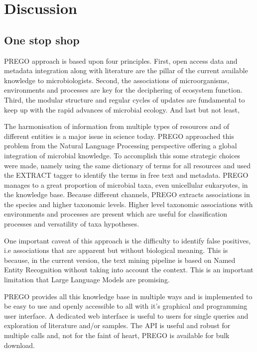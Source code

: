 \section{Discussion}
\label{sec:prego-discussion}

   \subsection{One stop shop}
   \label{subsec:prego-contents-disc}

PREGO approach is based upon four principles. First, open access data and
metadata integration along with literature are the pillar of the current
available knowledge to microbiologists. Second, the associations of microorganisms,
environments and processes are key for the deciphering of ecosystem function.
Third, the modular structure and regular cycles of updates are fundamental to
keep up with the rapid advances of microbial ecology. And last but not least,

The harmonisation of information from multiple types of resources and of different
entities is a major issue in science today. PREGO approached this problem from 
the Natural Language Processing perspective offering a global integration 
of microbial knowledge. To accomplish this some strategic choices were made, 
namely using the same dictionary of terms for all resources and used 
the EXTRACT tagger to identify the terms in free text and metadata.
PREGO manages to a great proportion of microbial taxa, even unicellular eukaryotes, in the knowledge base.
Because different channels, PREGO extracts associations in the species and higher taxonomic levels.
Higher level taxonomic associations with environments and processes are present
which are useful for classification processes and versatility of taxa hypotheses.

One important caveat of this approach is the difficulty to 
identify false positives, i.e associations that are apparent but without 
biological meaning. This is because, in the current version, the text mining
pipeline is based on Named Entity Recognition without taking into account 
the context. This is an important limitation that Large Language Models 
are promising.

PREGO provides all this knowledge base in multiple 
ways and is implemented to be easy to use and openly accessible to all with it’s graphical and programming user interface.
A dedicated web interface is useful to users for single queries
and exploration of literature and/or samples. The API is useful and 
robust for multiple calls and, not for the faint of heart, PREGO is 
available for bulk download. 

